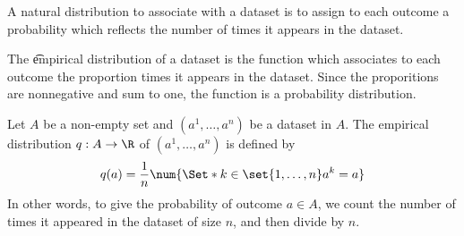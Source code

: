 

A natural distribution to associate with a dataset is to assign to each outcome a probability which reflects the number of times it appears in the dataset.


The \t{empirical distribution} of a dataset is the function which associates to each outcome the proportion times it appears in the dataset.
Since the proporitions are nonnegative and sum to one, the function is a probability distribution.


Let $A$ be a non-empty set and $(a^1, \dots, a^n)$ be a dataset in $A$.
The empirical distribution $q: A \to \R$ of $(a^1, \dots, a^n)$ is defined by
\[
  q(a) = \frac{1}{n} \num{\Set*{k \in \set{1, \dots, n}}{a^k = a}}
\]
In other words, to give the probability of outcome $a \in A$, we count the number of times it appeared in the dataset of size $n$, and then divide by $n$.

\blankpage

